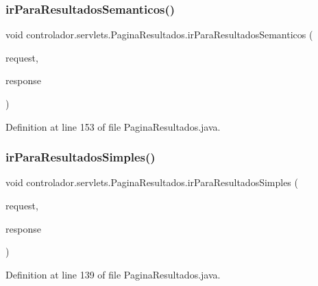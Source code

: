 \subsubsection{\texorpdfstring{ir\+Para\+Resultados\+Semanticos()}{irParaResultadosSemanticos()}}
{\footnotesize\ttfamily void controlador.\+servlets.\+Pagina\+Resultados.\+ir\+Para\+Resultados\+Semanticos (\begin{DoxyParamCaption}\item[{Http\+Servlet\+Request}]{request,  }\item[{Http\+Servlet\+Response}]{response }\end{DoxyParamCaption})\hspace{0.3cm}{\ttfamily [private]}}



Definition at line 153 of file Pagina\+Resultados.\+java.

\hypertarget{classcontrolador_1_1servlets_1_1PaginaResultados_ab1ceb8a61e89cb50dc11aad9c79ac749}{}\label{classcontrolador_1_1servlets_1_1PaginaResultados_ab1ceb8a61e89cb50dc11aad9c79ac749} 
\subsubsection{\texorpdfstring{ir\+Para\+Resultados\+Simples()}{irParaResultadosSimples()}}
{\footnotesize\ttfamily void controlador.\+servlets.\+Pagina\+Resultados.\+ir\+Para\+Resultados\+Simples (\begin{DoxyParamCaption}\item[{Http\+Servlet\+Request}]{request,  }\item[{Http\+Servlet\+Response}]{response }\end{DoxyParamCaption})\hspace{0.3cm}{\ttfamily [private]}}



Definition at line 139 of file Pagina\+Resultados.\+java.

\hypertarget{classcontrolador_1_1servlets_1_1PaginaResultados_a4c45ab121c5b183b6a40aa3d0d3447de}{}\label{classcontrolador_1_1servlets_1_1PaginaResultados_a4c45ab121c5b183b6a40aa3d0d3447de} 
